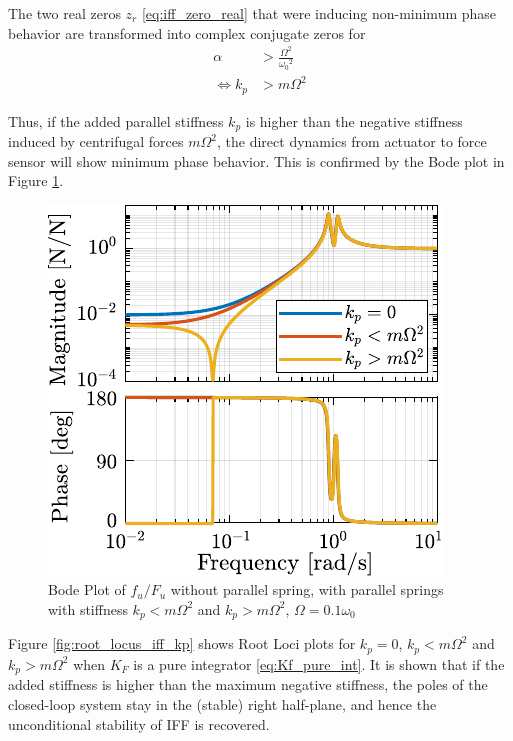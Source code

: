\documentclass{ISMA_USD2020}
\begin{document}
The two real zeros \(z_r\) \eqref{eq:iff_zero_real} that were inducing non-minimum phase behavior are transformed into complex conjugate zeros for
\begin{equation}
  \begin{aligned}
    \alpha &> \frac{\Omega^2}{{\omega_0}^2} \\
    \Leftrightarrow k_p &> m \Omega^2
  \end{aligned}
\end{equation}

Thus, if the added parallel stiffness \(k_p\) is higher than the negative stiffness induced by centrifugal forces \(m \Omega^2\), the direct dynamics from actuator to force sensor will show minimum phase behavior.
This is confirmed by the Bode plot in Figure \ref{fig:plant_iff_kp}.
\begin{figure}[htbp]
\centering
\includegraphics[scale=1]{figs/plant_iff_kp.pdf}
\caption{\label{fig:plant_iff_kp}Bode Plot of \(f_u/F_u\) without parallel spring, with parallel springs with stiffness \(k_p < m \Omega^2\) and \(k_p > m \Omega^2\), \(\Omega = 0.1 \omega_0\)}
\end{figure}

Figure \ref{fig:root_locus_iff_kp} shows Root Loci plots for \(k_p = 0\), \(k_p < m \Omega^2\) and \(k_p > m \Omega^2\) when \(K_F\) is a pure integrator \eqref{eq:Kf_pure_int}.
It is shown that if the added stiffness is higher than the maximum negative stiffness, the poles of the closed-loop system stay in the (stable) right half-plane, and hence the unconditional stability of IFF is recovered.
\end{document}
